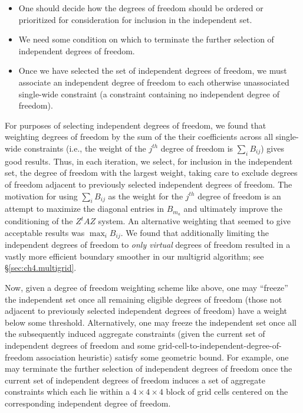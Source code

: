 \begin{itemize}
\item One should decide how the degrees of freedom should be ordered or prioritized for consideration for inclusion in the independent set.
\item We need some condition on which to terminate the further selection of independent degrees of freedom.
\item Once we have selected the set of independent degrees of freedom, we must associate an independent degree of freedom to each otherwise unassociated single-wide constraint (a constraint containing no independent degree of freedom).
\end{itemize}

For purposes of selecting independent degrees of freedom, we found that weighting degrees of freedom by the sum of the their coefficients across all single-wide constraints (i.e., the weight of the $j^{th}$ degree of freedom is $\sum_i B_{ij}$) gives good results. Thus, in each iteration, we select, for inclusion in the independent set, the degree of freedom with the largest weight, taking care to exclude degrees of freedom adjacent to previously selected independent degrees of freedom. The motivation for using $\sum_i B_{ij}$ as the weight for the $j^{th}$ degree of freedom is an attempt to maximize the diagonal entries in $B_{m_a}$ and ultimately improve the conditioning of the $Z^tAZ$ system. An alternative weighting that seemed to give acceptable results was $\max_i B_{ij}$. We found that additionally limiting the independent degrees of freedom to \emph{only virtual} degrees of freedom resulted in a vastly more efficient boundary smoother in our multigrid algorithm; see \S\ref{sec:ch4.multigrid}.

Now, given a degree of freedom weighting scheme like above, one may ``freeze'' the independent set once all remaining eligible degrees of freedom (those not adjacent to previously selected independent degrees of freedom) have a weight below some threshold. Alternatively, one may freeze the independent set once all the subsequently induced aggregate constraints (given the current set of independent degrees of freedom and some grid-cell-to-independent-degree-of-freedom association heuristic) satisfy some geometric bound. For example, one may terminate the further selection of independent degrees of freedom once the current set of independent degrees of freedom induces a set of aggregate constraints which each lie within a $4 \times 4 \times 4$ block of grid cells centered on the corresponding independent degree of freedom.

